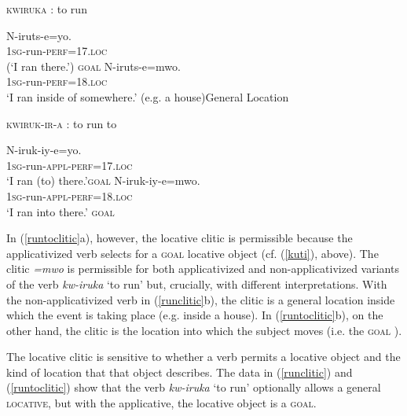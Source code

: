 \documentclass[output=paper]{langsci/langscibook}
\begin{document}
\begin{exe}
      \ex\label{runclitic}{\scshape kwiruka} : to run \begin{xlist}
	      \ex\gll *N-iruts-e=yo.\\
			      1{\scshape sg-}run-{\scshape perf=17.loc}\\
			      \glt (`I ran there.') \hfill *\textsc{goal}
	      \ex\gll N-iruts-e=mwo. \\
			      1{\scshape sg-}run-{\scshape perf=18.loc}\\
			      \glt `I ran inside of somewhere.' (e.g. a house)\hfill General Location
      \end{xlist}
      \ex\label{runtoclitic}{\scshape kwiruk-ir-a} : to run to\begin{xlist}
	      \ex\gll N-iruk-iy-e=yo.\\
			      1{\scshape sg}-run-{\scshape appl-perf=17.loc}\\
			      \glt `I ran (to) there.'\hfill \textsc{goal}
	      \ex\gll N-iruk-iy-e=mwo.\\
			      1{\scshape sg}-run-{\scshape appl-perf=18.loc}\\
			      \glt `I ran into there.' \hfill \textsc{goal}
      \end{xlist}
\end{exe}
In (\ref{runtoclitic}a), however, the locative clitic is permissible because the applicativized verb selects for a {\scshape goal}  locative object (cf. (\ref{kuti}), above). The clitic \emph{=mwo} is permissible for both applicativized and  non-applicativized variants of the verb \emph{kw-iruka} `to run' but, crucially, with different interpretations. With the non-applicativized verb in (\ref{runclitic}b), the clitic is a general location inside which the event is taking place (e.g. inside a house). In (\ref{runtoclitic}b), on the other hand,  the clitic is the location into which the subject moves (i.e. the {\scshape goal} ).  

The locative clitic is sensitive to whether a verb permits a locative object and the kind of location that that object describes. The data in (\ref{runclitic}) and (\ref{runtoclitic}) show that the verb \emph{kw-iruka} `to run' optionally allows a general {\scshape locative}, but with the applicative, the locative object is a {\scshape goal}.
\end{document}

